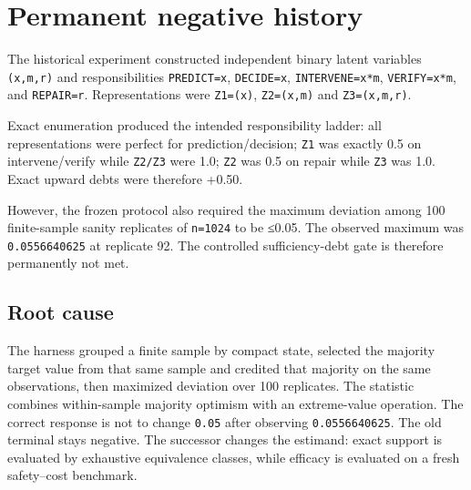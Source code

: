 \section{Permanent negative history}\label{permanent-negative-history}

The historical experiment constructed independent binary latent
variables \texttt{(x,m,r)} and responsibilities \texttt{PREDICT=x},
\texttt{DECIDE=x}, \texttt{INTERVENE=x*m}, \texttt{VERIFY=x*m}, and
\texttt{REPAIR=r}. Representations were \texttt{Z1=(x)},
\texttt{Z2=(x,m)} and \texttt{Z3=(x,m,r)}.

Exact enumeration produced the intended responsibility ladder: all
representations were perfect for prediction/decision; \texttt{Z1} was
exactly 0.5 on intervene/verify while \texttt{Z2/Z3} were 1.0;
\texttt{Z2} was 0.5 on repair while \texttt{Z3} was 1.0. Exact upward
debts were therefore +0.50.

However, the frozen protocol also required the maximum deviation among
100 finite-sample sanity replicates of \texttt{n=1024} to be ≤0.05. The
observed maximum was \texttt{0.0556640625} at replicate 92. The
controlled sufficiency-debt gate is therefore permanently not met.

\subsection{Root cause}\label{root-cause}

The harness grouped a finite sample by compact state, selected the
majority target value from that same sample and credited that majority
on the same observations, then maximized deviation over 100 replicates.
The statistic combines within-sample majority optimism with an
extreme-value operation. The correct response is not to change
\texttt{0.05} after observing \texttt{0.0556640625}. The old terminal
stays negative. The successor changes the estimand: exact support is
evaluated by exhaustive equivalence classes, while efficacy is evaluated
on a fresh safety--cost benchmark.
